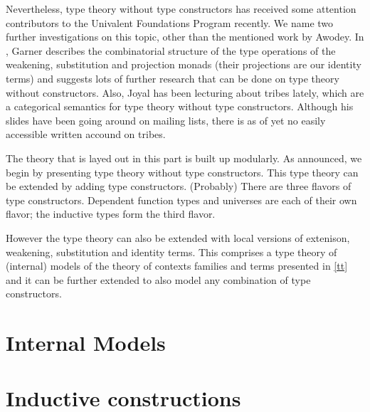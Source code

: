 \documentclass{article}
\begin{document}
Nevertheless, type theory without type constructors has received some attention
contributors to the Univalent Foundations Program recently. We name two
further investigations on this topic, other than the mentioned work by Awodey.
In \cite{Garner2014}, Garner describes the combinatorial structure
of the type operations of the weakening, substitution and projection monads
(their projections are our identity terms) and suggests lots of further research
that can be done on type theory without constructors. Also, Joyal has been
lecturing about tribes lately, which are a categorical semantics for type theory
without type constructors. Although his slides have been going around on
mailing lists, there is as of yet no easily accessible written accound on tribes.

The theory that is layed out in this part is built up modularly. As announced,
we begin by presenting type theory without type constructors. This type theory
can be extended by adding type constructors. (Probably) There are three flavors
of type constructors. Dependent function types and universes are each of their
own flavor; the inductive types form the third flavor.

However the type theory can also be extended with local versions of extenison,
weakening, substitution and identity terms. This comprises a type theory of
(internal) models of the theory of contexts families and terms presented in
\autoref{tt} and it can be further extended to also model any combination of
type constructors.





\part{Internal Models}





\part{Inductive constructions}





%

%

%



\end{document}
